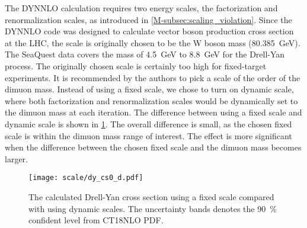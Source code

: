 \documentclass[../main.tex]{subfiles}
\begin{document}
The DYNNLO calculation requires two energy scales, the factorization and renormalization scales,
as introduced in \cref{M-subsec:scaling_violation}. Since the DYNNLO code was designed to calculate
vector boson production cross section at the LHC, the scale is originally chosen to be the W boson mass (\SI{80.385}{\GeV}).
The SeaQuest data covers the mass of \SI{4.5}{\GeV} to \SI{8.8}{\GeV} for the Drell-Yan
process. The originally chosen scale is certainly too high for fixed-target experiments.
It is recommended by the authors to pick a scale of the order of the dimuon mass.
Instead of using a fixed scale, we chose to turn on dynamic scale,
where both factorization and renormalization scales would be dynamically set to the dimuon mass at
each iteration.  The difference between using a fixed scale and dynamic scale is shown in \cref{fig:DY_scale}.
The overall difference is small, as the chosen fixed scale is within the dimuon mass range of interest.
The effect is more significant when the difference between the chosen fixed scale and the dimuon mass
becomes larger.
\begin{figure}[h!]
	\centering
	\texttt{[image: scale/dy\_cs0\_d.pdf]}
	\caption{The calculated Drell-Yan cross section using a fixed scale compared with using dynamic scales.
		The uncertainty bands denotes the \SI{90}{\percent} confident level from CT18NLO PDF.
	}
	\label{fig:DY_scale}
\end{figure}




\ifSubfilesClassLoaded{ \printbibliography[heading=bibintoc,title={References}]}{}
\end{document}
